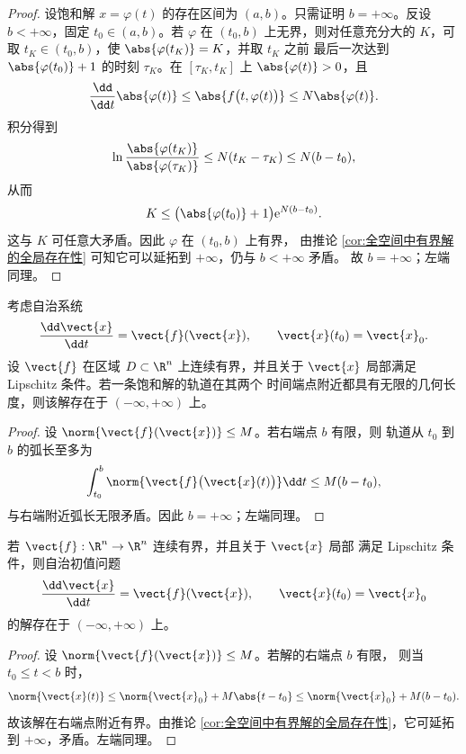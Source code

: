 \begin{proof}
	设饱和解 $x=\varphi(t)$ 的存在区间为 $(a,b)$。只需证明
	$b=+\infty$。反设 $b<+\infty$，固定 $t_0\in(a,b)$。若 $\varphi$ 在
	$(t_0,b)$ 上无界，则对任意充分大的 $K$，可取
	$t_K\in(t_0,b)$，使 $\abs{\varphi(t_K)}=K$，并取 $t_K$ 之前
	最后一次达到 $\abs{\varphi(t_0)}+1$ 的时刻 $\tau_K$。在
	$[\tau_K,t_K]$ 上 $\abs{\varphi(t)}>0$，且
	\[
		\dfrac{\dd}{\dd t}\abs{\varphi(t)}
		\leq\abs{f\bigl(t,\varphi(t)\bigr)}
		\leq N\abs{\varphi(t)}.
	\]
	积分得到
	\[
		\ln\dfrac{\abs{\varphi(t_K)}}{\abs{\varphi(\tau_K)}}
		\leq N(t_K-\tau_K)
		\leq N(b-t_0),
	\]
	从而
	\[
		K\leq
		\bigl(\abs{\varphi(t_0)}+1\bigr)\mathrm{e}^{N(b-t_0)}.
	\]
	这与 $K$ 可任意大矛盾。因此 $\varphi$ 在 $(t_0,b)$ 上有界，
	由推论 \ref{cor:全空间中有界解的全局存在性} 可知它可以延拓到
	$+\infty$，仍与 $b<+\infty$ 矛盾。
	故 $b=+\infty$；左端同理。
\end{proof}

\begin{corollary}[有界向量场下的延拓]
	\label{cor:有界向量场下的延拓}
	考虑自治系统
	\[
		\dfrac{\dd\vect{x}}{\dd t}=\vect{f}(\vect{x}),
		\qquad
		\vect{x}(t_0)=\vect{x}_0.
	\]
	设 $\vect{f}$ 在区域 $D\subset\R^n$ 上连续有界，并且关于
	$\vect{x}$ 局部满足 Lipschitz 条件。若一条饱和解的轨道在其两个
	时间端点附近都具有无限的几何长度，则该解存在于
	$(-\infty,+\infty)$ 上。
\end{corollary}

\begin{proof}
	设 $\norm{\vect{f}(\vect{x})}\leq M$。若右端点 $b$ 有限，则
	轨道从 $t_0$ 到 $b$ 的弧长至多为
	\[
		\int_{t_0}^{b}
		\norm{\vect{f}\bigl(\vect{x}(t)\bigr)}\dd t
		\leq M(b-t_0),
	\]
	与右端附近弧长无限矛盾。因此 $b=+\infty$；左端同理。
\end{proof}

\begin{corollary}[全空间中有界向量场的全局存在性]
	\label{cor:全空间中有界向量场的全局存在性}
	若 $\vect{f}:\R^n\to\R^n$ 连续有界，并且关于 $\vect{x}$ 局部
	满足 Lipschitz 条件，则自治初值问题
	\[
		\dfrac{\dd\vect{x}}{\dd t}=\vect{f}(\vect{x}),
		\qquad
		\vect{x}(t_0)=\vect{x}_0
	\]
	的解存在于 $(-\infty,+\infty)$ 上。
\end{corollary}

\begin{proof}
	设 $\norm{\vect{f}(\vect{x})}\leq M$。若解的右端点 $b$ 有限，
	则当 $t_0\leq t<b$ 时，
	\[
		\norm{\vect{x}(t)}
		\leq\norm{\vect{x}_0}+M\abs{t-t_0}
		\leq\norm{\vect{x}_0}+M(b-t_0).
	\]
	故该解在右端点附近有界。由推论
	\ref{cor:全空间中有界解的全局存在性}，它可延拓到
	$+\infty$，矛盾。左端同理。
\end{proof}

